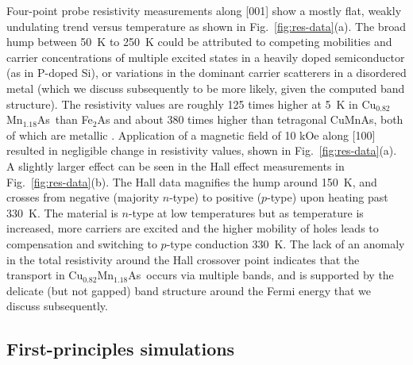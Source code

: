 \documentclass[10pt,doublespacing,edeposit]{uiucthesis2020}
\newcommand*{\cumnas}{Cu$_{0.82}$Mn$_{1.18}$As}
\begin{document}
\begin{mainmatter}
Four-point probe resistivity measurements along [001] show a mostly flat, weakly undulating trend versus temperature as shown in Fig.\ \ref{fig:res-data}(a).
The broad hump between 50~K to 250~K could be attributed to competing mobilities and carrier concentrations of multiple excited states in a heavily doped semiconductor (as in P-doped Si),\cite{Chapman1963} or variations in the dominant carrier scatterers in a disordered metal (which we discuss subsequently to be more likely, given the computed band structure).
The resistivity values are roughly 125 times higher at 5~K in \cumnas\ than Fe$_2$As and about 380 times higher than tetragonal CuMnAs, both of which are metallic \cite{Takeshita2017,Wadley2013}.
Application of a magnetic field of 10 kOe along [100]  resulted in negligible change in resistivity values, shown in Fig.\ \ref{fig:res-data}(a).
A slightly larger effect can be seen in the Hall effect measurements in Fig.\ \ref{fig:res-data}(b).
The Hall data magnifies the hump around 150~K, and crosses from negative (majority $n$-type) to positive ($p$-type) upon heating past 330~K. 
The material is $n$-type at low temperatures but as temperature is increased, more carriers are excited and the higher mobility of holes leads to compensation and switching to $p$-type conduction 330~K.
The lack of an anomaly in the total resistivity around the Hall crossover point indicates that the transport in \cumnas\ occurs via multiple bands, and is supported by the delicate (but not gapped) band structure around the Fermi energy  that we discuss subsequently. 

\subsection{First-principles simulations}


\end{mainmatter}
\end{document}
